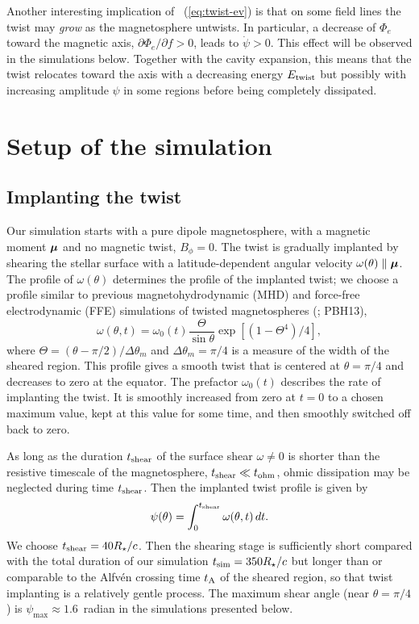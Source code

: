 Another interesting implication of \Eq~(\ref{eq:twist-ev}) is that on some field
lines the twist may {\it grow} as the magnetosphere untwists. In particular, a
decrease of $\Phi_e$ toward the magnetic axis, $\partial\Phi_e/\partial f>0$,
leads to $\dot{\psi}>0$. This effect will be observed in the simulations below.
Together with the cavity expansion, this means that the twist relocates toward
the axis with a decreasing energy $E_{\rm twist}$ but possibly
with
increasing amplitude $\psi$ in some regions before being completely dissipated.


\section{Setup of the simulation}
\label{sec:setup}

\subsection{Implanting the twist}
\label{sec:implant}

Our simulation starts with a pure dipole magnetosphere, with a magnetic moment
$\bm{\mu}$ and no magnetic twist, $B_\phi=0$. The twist is gradually
implanted by shearing the stellar surface with a latitude-dependent angular
velocity $\mathbf{\omega}(\theta)\parallel\bm{\mu}$. The profile of
$\omega(\theta)$ determines the profile of the implanted twist; we choose a
profile similar to previous magnetohydrodynamic (MHD) and force-free
electrodynamic (FFE) simulations of twisted magnetospheres
(\citealt{mikic_disruption_1994}; PBH13),
\begin{equation}
  \label{eq:3}
  \omega(\theta,t) = \omega_0(t)\frac{\Theta}{\sin\theta}\exp \left[ (1 - \Theta^4)/4 \right],
\end{equation}
where $\Theta = (\theta - \pi/2)/\Delta\theta_m$ and $\Delta \theta_m = \pi/4$
is a measure of the width of the sheared region. This profile gives a smooth
twist that is centered at $\theta=\pi/4$ and decreases to zero at the equator.
The prefactor $\omega_0(t)$ describes the rate of implanting the twist. It is
smoothly increased from zero at $t=0$ to a chosen maximum value, kept at this
value for some time, and then smoothly switched off back to zero.

As long as the duration $t_{\rm shear}$ of the surface shear $\omega\neq 0$ is shorter than
the resistive timescale of the magnetosphere, $t_{\rm shear}\ll t_{\rm ohm}$, ohmic dissipation
may be neglected during time $t_{\rm shear}$. Then the implanted twist profile is given
by
\begin{equation}
  \psi(\theta)=\int_0^{t_{\rm shear}}\omega(\theta,t)\,dt.
\end{equation}
We choose $t_{\rm shear}=40 R_\star/c$. Then the shearing stage is sufficiently short
compared with the total duration of our simulation $t_\mathrm{sim} = 350R_\star/c$
but longer than or comparable to the Alfv\'en crossing time $t_{\rm A}$ of the sheared
region, so that twist implanting is a relatively gentle process. The maximum
shear angle (near $\theta=\pi/4$) is $\psi_{\max}\approx 1.6$~radian in the
simulations presented below.

